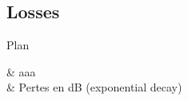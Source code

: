 \subsection[5min-Pascal]{Losses}
\begin{frame}{Plan}
    \begin{makelist}[\small][1.5]
        \icon[red]{\faTimes} & aaa\\
        \icon[red]{\faTimes} & Pertes en dB (exponential decay)\\
    \end{makelist}
\end{frame}